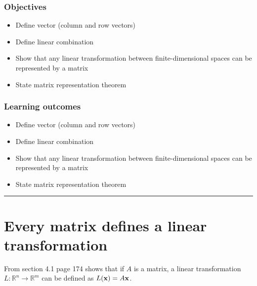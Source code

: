 %


\subsubsection*{Objectives}
\begin{itemize}
	\item Define vector (column and row vectors)
	\item Define linear combination
	\item Show that any linear transformation between finite-dimensional spaces can be represented by a matrix
	\item State matrix representation theorem
    
\end{itemize}



\subsubsection*{Learning outcomes}
\begin{itemize}
	\item Define vector (column and row vectors)
	\item Define linear combination
	\item Show that any linear transformation between finite-dimensional spaces can be represented by a matrix
	\item State matrix representation theorem
    
\end{itemize}





\rule[0.01in]{\textwidth}{0.0025in}


\section{Every matrix defines a linear transformation}
From section 4.1 page 174 shows that if $A$ is a matrix,  a linear transformation $L: \mathbb{R}^n \to \mathbb{R}^m$ can be defined as $L({\bf x}) = A {\bf x}$. 


